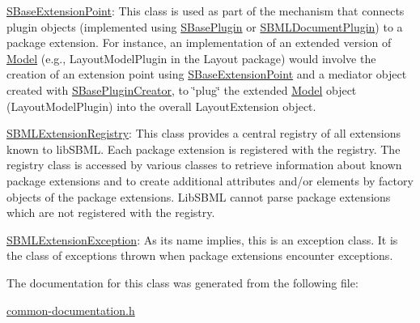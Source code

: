 \begin{DoxyItemize}
\item \hyperlink{class_s_base_extension_point}{S\+Base\+Extension\+Point}\+: This class is used as part of the mechanism that connects plugin objects (implemented using \hyperlink{class_s_base_plugin}{S\+Base\+Plugin} or \hyperlink{class_s_b_m_l_document_plugin}{S\+B\+M\+L\+Document\+Plugin}) to a package extension. For instance, an implementation of an extended version of \hyperlink{class_model}{Model} (e.\+g., Layout\+Model\+Plugin in the Layout package) would involve the creation of an extension point using \hyperlink{class_s_base_extension_point}{S\+Base\+Extension\+Point} and a mediator object created with \hyperlink{class_s_base_plugin_creator}{S\+Base\+Plugin\+Creator}, to \char`\"{}plug\char`\"{} the extended \hyperlink{class_model}{Model} object (Layout\+Model\+Plugin) into the overall Layout\+Extension object.\end{DoxyItemize}
\begin{DoxyItemize}
\item \hyperlink{class_s_b_m_l_extension_registry}{S\+B\+M\+L\+Extension\+Registry}\+: This class provides a central registry of all extensions known to lib\+S\+B\+ML. Each package extension is registered with the registry. The registry class is accessed by various classes to retrieve information about known package extensions and to create additional attributes and/or elements by factory objects of the package extensions. Lib\+S\+B\+ML cannot parse package extensions which are not registered with the registry.\end{DoxyItemize}
\begin{DoxyItemize}
\item \hyperlink{class_s_b_m_l_extension_exception}{S\+B\+M\+L\+Extension\+Exception}\+: As its name implies, this is an exception class. It is the class of exceptions thrown when package extensions encounter exceptions. \end{DoxyItemize}


The documentation for this class was generated from the following file\+:\begin{DoxyCompactItemize}
\item 
\hyperlink{common-documentation_8h}{common-\/documentation.\+h}\end{DoxyCompactItemize}
